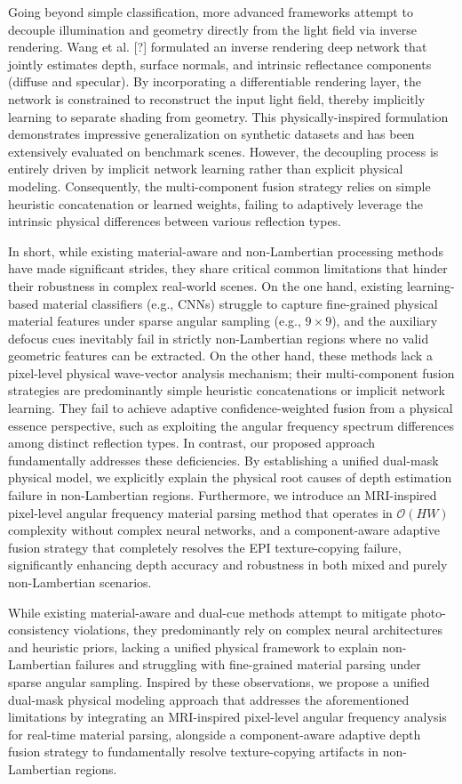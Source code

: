 Going beyond simple classification, more advanced frameworks attempt to decouple illumination and geometry directly from the light field via inverse rendering. Wang et al. [?] formulated an inverse rendering deep network that jointly estimates depth, surface normals, and intrinsic reflectance components (diffuse and specular). By incorporating a differentiable rendering layer, the network is constrained to reconstruct the input light field, thereby implicitly learning to separate shading from geometry. This physically-inspired formulation demonstrates impressive generalization on synthetic datasets and has been extensively evaluated on benchmark scenes. However, the decoupling process is entirely driven by implicit network learning rather than explicit physical modeling. Consequently, the multi-component fusion strategy relies on simple heuristic concatenation or learned weights, failing to adaptively leverage the intrinsic physical differences between various reflection types.

In short, while existing material-aware and non-Lambertian processing methods have made significant strides, they share critical common limitations that hinder their robustness in complex real-world scenes. On the one hand, existing learning-based material classifiers (e.g., CNNs) struggle to capture fine-grained physical material features under sparse angular sampling (e.g., $9 \times 9$), and the auxiliary defocus cues inevitably fail in strictly non-Lambertian regions where no valid geometric features can be extracted. On the other hand, these methods lack a pixel-level physical wave-vector analysis mechanism; their multi-component fusion strategies are predominantly simple heuristic concatenations or implicit network learning. They fail to achieve adaptive confidence-weighted fusion from a physical essence perspective, such as exploiting the angular frequency spectrum differences among distinct reflection types. In contrast, our proposed approach fundamentally addresses these deficiencies. By establishing a unified dual-mask physical model, we explicitly explain the physical root causes of depth estimation failure in non-Lambertian regions. Furthermore, we introduce an MRI-inspired pixel-level angular frequency material parsing method that operates in $\mathcal{O}(HW)$ complexity without complex neural networks, and a component-aware adaptive fusion strategy that completely resolves the EPI texture-copying failure, significantly enhancing depth accuracy and robustness in both mixed and purely non-Lambertian scenarios.

While existing material-aware and dual-cue methods attempt to mitigate photo-consistency violations, they predominantly rely on complex neural architectures and heuristic priors, lacking a unified physical framework to explain non-Lambertian failures and struggling with fine-grained material parsing under sparse angular sampling. Inspired by these observations, we propose a unified dual-mask physical modeling approach that addresses the aforementioned limitations by integrating an MRI-inspired pixel-level angular frequency analysis for real-time material parsing, alongside a component-aware adaptive depth fusion strategy to fundamentally resolve texture-copying artifacts in non-Lambertian regions.